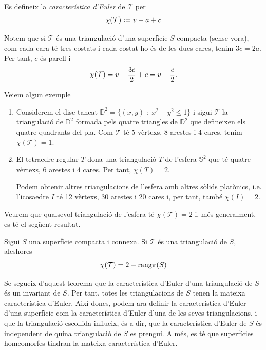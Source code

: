 \documentclass[../main.tex]{subfiles}
\begin{document}
\begin{defi}
\label{def:caracteristicaeuler} Es defineix la \textit{característica d'Euler} de $\mathcal{T}$ per
\begin{equation}
    \notag
    \chi(\mathcal{T}):=v-a+c
\end{equation}
\end{defi}

Notem que si $\mathcal{T}$ és una triangulació d'una superfície $S$ compacta (sense vora), com cada cara té tres costats i cada costat ho és de les dues cares, tenim $3c = 2a$. Per tant, $c$ és parell i
\begin{equation}
    \notag
    \chi(\mathcal{T})=v-\frac{3c}{2}+c=v-\frac{c}{2}.
\end{equation}

\begin{ej}
\label{ej:caracteristicaeuler} Veiem algun exemple
\begin{enumerate}
    \item Considerem el disc tancat $\mathbb{D}^2 = \{(x,y)\;:\;x^2+y^2\leq 1\}$ i sigui $\mathcal{T}$ la triangulació de $\mathbb{D}^2$ formada pels quatre triangles de $\mathbb{D}^2$ que defineixen els quatre quadrants del pla. Com $\mathcal{T}$ té 5 vèrtexs, 8 arestes i 4 cares, tenim $\chi(\mathcal{T}) = 1$.
    \item El tetraedre regular $T$ dona una triangulació $T$ de l'esfera $\mathbb{S}^2$ que té quatre vèrtexs, 6 arestes i 4 cares. Per tant, $\chi(T)= 2$.
    
    Podem obtenir altres triangulacions de l'esfera amb altres sòlids platònics, i.e. l'icosaedre $I$ té 12 vèrtexs, 30 arestes i 20 cares i, per tant, també $\chi(I)=2$.
\end{enumerate}
\end{ej}

Veurem que qualsevol triangulació de l'esfera té $\chi(\mathcal{T})=2$ i, més generalment, es té el següent resultat.

\begin{prop}
\label{prop:caracteristicaeulerrang} Sigui $S$ una superfície compacta i connexa. Si $\mathcal{T}$ és una triangulació de $S$, aleshores
\begin{equation}
    \notag
    \chi(\mathcal{T}) = 2-\mathrm{rang}\pi(S)
\end{equation}
\end{prop}

Se segueix d'aquest teorema que la característica d'Euler d'una triangulació de $S$ és un invariant de $S$. Per tant, totes les triangulacions de $S$ tenen la mateixa característica d'Euler. Així doncs, podem ara definir la característica d'Euler d'una superfície  com la característica d'Euler d'una de les seves triangulacions, i que la triangulació escollida influeix, és a dir, que la característica d'Euler de $S$ és independent de quina triangulació de $S$ es prengui. A més, es té que superfícies homeomorfes tindran la mateixa característica d'Euler.
\end{document}
